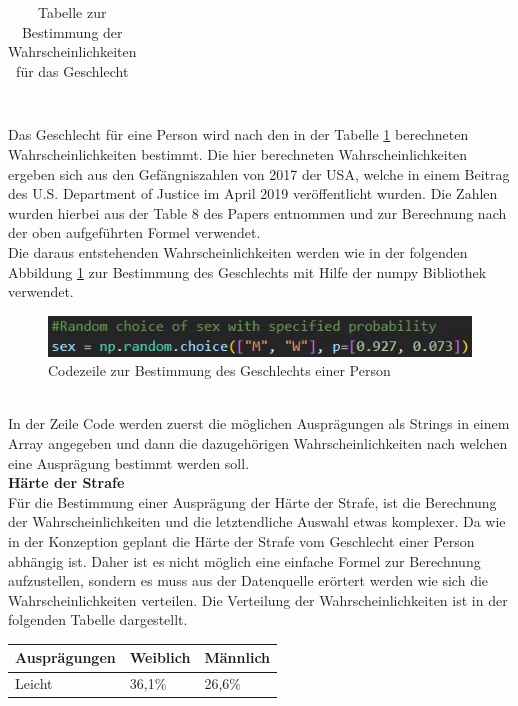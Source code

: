 \begin{onehalfspace}
\begin{table}[!h]
\begin{tabular}{|c|c|c|}
    \end{tabular}
\caption{Tabelle zur Bestimmung der Wahrscheinlichkeiten für das Geschlecht}
\label{table:3}
\end{table}\\
Das Geschlecht für eine Person wird nach den in der Tabelle \ref{table:3} berechneten Wahrscheinlichkeiten bestimmt. Die hier berechneten Wahrscheinlichkeiten ergeben sich aus den Gefängniszahlen von 2017 der USA, welche in einem Beitrag des U.S. Department of Justice im April 2019 veröffentlicht wurden. Die Zahlen wurden hierbei aus der \glqq{}Table 8\grqq{} des Papers entnommen und zur Berechnung nach der oben aufgeführten Formel verwendet.\cite[S. 17]{Bronson2017}\\
Die daraus entstehenden Wahrscheinlichkeiten werden wie in der folgenden Abbildung \ref{fig:GeschlechtscodeS1} zur Bestimmung des Geschlechts mit Hilfe der \glqq{}numpy\grqq{} Bibliothek verwendet.
\begin{figure}[h]
    \centering
    \includegraphics{Diagramme/Sz1_GeschlechtsCode.JPG}
    \caption{Codezeile zur Bestimmung des Geschlechts einer Person}
    \label{fig:GeschlechtscodeS1}
\end{figure}\\
In der Zeile Code werden zuerst die möglichen Ausprägungen als Strings in einem Array angegeben und dann die dazugehörigen Wahrscheinlichkeiten nach welchen eine Ausprägung bestimmt werden soll.\\
\textbf{Härte der Strafe}\\
Für die Bestimmung einer Ausprägung der Härte der Strafe, ist die Berechnung der Wahrscheinlichkeiten und die letztendliche Auswahl etwas komplexer. Da wie in der Konzeption geplant die Härte der Strafe vom Geschlecht einer Person abhängig ist. Daher ist es nicht möglich eine einfache Formel zur Berechnung aufzustellen, sondern es muss aus der Datenquelle erörtert werden wie sich die Wahrscheinlichkeiten verteilen. Die Verteilung der Wahrscheinlichkeiten ist in der folgenden Tabelle dargestellt.\\
\begin{table}[h]
    \centering
    \begin{tabular}{|l|l|l|}
    \hline
    \textbf{Ausprägungen} & \textbf{Weiblich} & \textbf{Männlich} \\ \hline
    Leicht                & 36,1\%            & 26,6\%            \\ \hline

\end{tabular}
\end{table}
\end{onehalfspace}
